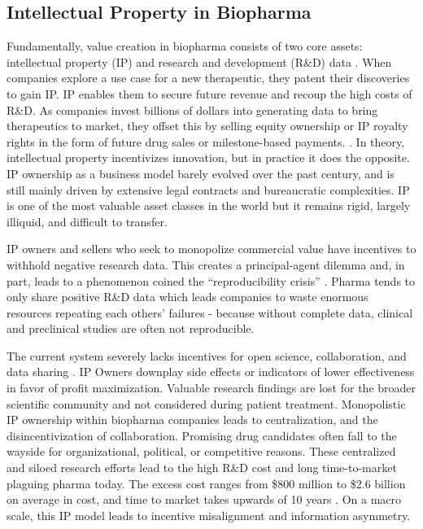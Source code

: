 \documentclass[10pt,letterpaper]{article}
\begin{document}
\subsection{Intellectual Property in Biopharma}
Fundamentally, value creation in biopharma consists of two core assets: intellectual property (IP) and research and development (R\&D) data \citep{Chandra2011}. When companies explore a use case for a new therapeutic, they patent their discoveries to gain IP. IP enables them to secure future revenue and recoup the high costs of R\&D. As companies invest billions of dollars into generating data to bring therapeutics to market, they offset this by selling equity ownership or IP royalty rights in the form of future drug sales or milestone-based payments. \citep{Wouters2020}. In theory, intellectual property incentivizes innovation, but in practice it does the opposite. IP ownership as a business model barely evolved over the past century, and is still mainly driven by extensive legal contracts and bureaucratic complexities. IP is one of the most valuable asset classes in the world but it remains rigid, largely illiquid, and difficult to transfer. 

IP owners and sellers who seek to monopolize commercial value have incentives to withhold negative research data. This creates a principal-agent dilemma and, in part, leads to a phenomenon coined the “reproducibility crisis” \citep{Sherkow2017}. Pharma tends to only share positive R\&D data which leads companies to waste enormous resources repeating each others’ failures - because without complete data, clinical and preclinical studies are often not reproducible. 

The current system severely lacks incentives for open science, collaboration, and data sharing \citep{Ali-Khan2017}. IP Owners downplay side effects or indicators of lower effectiveness in favor of profit maximization. Valuable research findings are lost for the broader scientific community and not considered during patient treatment. Monopolistic IP ownership within biopharma companies leads to centralization, and the disincentivization of collaboration. Promising drug candidates often fall to the wayside for organizational, political, or competitive reasons. These centralized and siloed research efforts lead to the high R\&D cost and long time-to-market plaguing pharma today. The excess cost ranges from \$800 million to \$2.6 billion on average in cost, and time to market takes upwards of 10 years \citep{DiMasi2016}. On a macro scale, this IP model leads to incentive misalignment and information asymmetry. 
\end{document}
